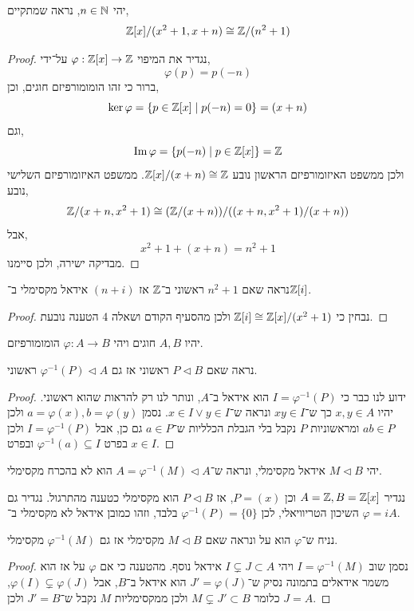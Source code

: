 \question{}
\subquestion{}
יהי $n \in \mathbb{N}$, נראה שמתקיים,
\[
	\mathbb{Z}[x] / (x^2 + 1, x + n)
	\cong \mathbb{Z} / (n^2 + 1)
\]
\begin{proof}
	נגדיר את המיפוי $\varphi : \mathbb{Z}[x] \to \mathbb{Z}$ על־ידי,
	\[
		\varphi(p)
		= p(-n)
	\]
	ברור כי זהו הומומורפיזם חוגים, וכן,
	\[
		\ker \varphi
		= \{ p \in \mathbb{Z}[x] \mid p(-n) = 0 \}
		= (x + n)
	\]
	וגם,
	\[
		\operatorname{Im} \varphi
		= \{ p(-n) \mid p \in \mathbb{Z}[x] \}
		= \mathbb{Z}
	\]
	ולכן ממשפט האיזומורפיזם הראשון נובע $\mathbb{Z}[x] / (x + n) \cong \mathbb{Z}$.
	ממשפט האיזומורפיזם השלישי נובע,
	\[
		\mathbb{Z} / (x + n, x^2 + 1)
		\cong (\mathbb{Z} / (x + n)) / ((x + n, x^2 + 1) / (x + n))
	\]
	אבל,
	\[
		x^2 + 1 + (x + n)
		= n^2 + 1
	\]
	מבדיקה ישירה, ולכן סיימנו.
\end{proof}

\subquestion{}
נראה שאם $n^2 + 1$ ראשוני ב־$\mathbb{Z}$ אז $(n + i)$ אידאל מקסימלי ב־$\mathbb{Z}[i]$.
\begin{proof}
	נבחין כי $\mathbb{Z}[i] \cong \mathbb{Z}[x] / (x^2 + 1)$ ולכן מהסעיף הקודם ושאלה 4 הטענה נובעת.
\end{proof}

\question{}
יהיו $A, B$ חוגים ויהי $\varphi : A \to B$ הומומורפיזם.

\subquestion{}
נראה שאם $P \triangleleft B$ ראשוני אז גם $\varphi^{-1}(P) \triangleleft A$ ראשוני.
\begin{proof}
	ידוע לנו כבר כי $I = \varphi^{-1}(P)$ הוא אידאל ב־$A$, ונותר לנו רק להראות שהוא ראשוני.
	יהיו $x, y \in A$ כך ש־$x y \in I$ ונראה ש־$x \in I \lor y \in I$.
	נסמן $a = \varphi(x), b = \varphi(y)$ ולכן $a b \in P$ ומראשוניות $P$ נקבל בלי הגבלת הכלליות ש־$a \in P$ גם כן, אבל $I = \varphi^{-1}(P)$ ולכן בפרט $\varphi^{-1}(a) \subseteq I$ ובפרט $x \in I$.
\end{proof}

\subquestion{}
יהי $M \triangleleft B$ אידאל מקסימלי, ונראה ש־$A = \varphi^{-1}(M) \triangleleft A$ הוא לא בהכרח מקסימלי.
\begin{solution}
	נגדיר $A = \mathbb{Z}, B = \mathbb{Z}[x]$ וכן $P = (x)$, אז $P \triangleleft B$ הוא מקסימלי כטענה מהתרגול.
	נגדיר גם $\varphi = i$ השיכון הטריוויאלי, לכן $\varphi^{-1}(P) = \{ 0 \}$ בלבד, וזהו כמובן אידאל לא מקסימלי ב־$A$.
\end{solution}

\subquestion{}
נניח ש־$\varphi$ הוא על ונראה שאם $M \triangleleft B$ מקסימלי אז גם $\varphi^{-1}(M)$ מקסימלי.
\begin{proof}
	נסמן שוב $I = \varphi^{-1}(M)$ ויהי $I \subsetneq J \subset A$ אידאל נוסף.
	מהטענה כי אם $\varphi$ על אז הוא משמר אידאלים בתמונה נסיק ש־$J' = \varphi(J)$ הוא אידאל ב־$B$, אבל $\varphi(I) \subsetneq \varphi(J)$, כלומר $M \subsetneq J' \subset B$ ולכן ממקסימליות $M$ נקבל ש־$J' = B$ ולכן $J = A$.
\end{proof}

